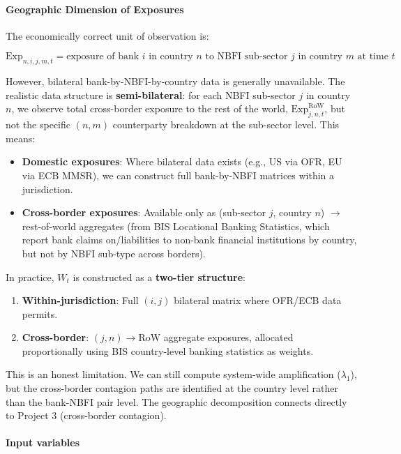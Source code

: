 \documentclass[11pt,a4paper]{article}
\begin{document}
\paragraph{Geographic Dimension of Exposures}

The economically correct unit of observation is:

\[\text{Exp}_{n,i,j,m,t} = \text{exposure of bank } i \text{ in country } n \text{ to NBFI sub-sector } j \text{ in country } m \text{ at time } t\]

However, bilateral bank-by-NBFI-by-country data is generally unavailable. The realistic data structure is \textbf{semi-bilateral}: for each NBFI sub-sector $j$ in country $n$, we observe total cross-border exposure to the rest of the world, $\text{Exp}_{j,n,t}^{\text{RoW}}$, but not the specific $(n,m)$ counterparty breakdown at the sub-sector level. This means:

\begin{itemize}
\item \textbf{Domestic exposures}: Where bilateral data exists (e.g., US via OFR, EU via ECB MMSR), we can construct full bank-by-NBFI matrices within a jurisdiction.
\item \textbf{Cross-border exposures}: Available only as (sub-sector $j$, country $n$) $\rightarrow$ rest-of-world aggregates (from BIS Locational Banking Statistics, which report bank claims on/liabilities to non-bank financial institutions by country, but not by NBFI sub-type across borders).

\end{itemize}
In practice, $W_t$ is constructed as a \textbf{two-tier structure}:
\begin{enumerate}
\item \textbf{Within-jurisdiction}: Full $(i,j)$ bilateral matrix where OFR/ECB data permits.
\item \textbf{Cross-border}: $(j,n) \to \text{RoW}$ aggregate exposures, allocated proportionally using BIS country-level banking statistics as weights.

\end{enumerate}
This is an honest limitation. We can still compute system-wide amplification ($\lambda_1$), but the cross-border contagion paths are identified at the country level rather than the bank-NBFI pair level. The geographic decomposition connects directly to Project 3 (cross-border contagion).


\paragraph{Input variables}
\end{document}
